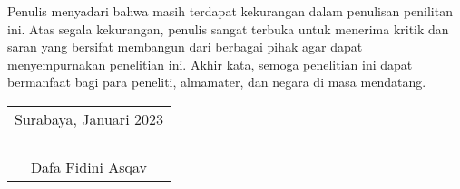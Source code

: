 Penulis menyadari bahwa masih terdapat kekurangan dalam penulisan penilitan ini. Atas segala kekurangan, penulis sangat
terbuka untuk menerima kritik dan saran yang bersifat membangun dari berbagai pihak agar dapat menyempurnakan penelitian ini. 
Akhir kata, semoga penelitian ini dapat bermanfaat bagi para peneliti, almamater, dan negara di masa mendatang.

\begin{flushright}
  \begin{tabular}[b]{c}
    Surabaya, Januari 2023\\
    \\
    \\
    \\
    \\
    Dafa Fidini Asqav
  \end{tabular}
\end{flushright}

